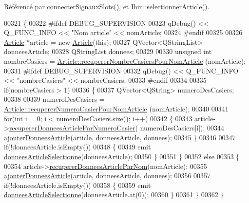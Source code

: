 Référencé par \hyperlink{_supervision_8cpp_source_l00273}{connecter\+Signaux\+Slots()}, et \hyperlink{_ihm_8cpp_source_l00291}{Ihm\+::selectionner\+Article()}.


\begin{DoxyCode}
00321 \{
00322 \textcolor{preprocessor}{    #ifdef DEBUG\_SUPERVISION}
00323         qDebug() << Q\_FUNC\_INFO << \textcolor{stringliteral}{"Nom article"} << nomArticle;
00324 \textcolor{preprocessor}{    #endif}
00325 
00326     \hyperlink{class_article}{Article} *article = \textcolor{keyword}{new} \hyperlink{class_article}{Article}(\textcolor{keyword}{this});
00327     QVector<QStringList> donneesArticle;
00328     QStringList donnees;
00329 
00330     \textcolor{keywordtype}{unsigned} \textcolor{keywordtype}{int} nombreCasiers = \hyperlink{class_article_acdd796ad55a7fde0c229c8c2df7050cc}{Article::recupererNombreCasiersPourNomArticle}
      (nomArticle);    
00331 \textcolor{preprocessor}{    #ifdef DEBUG\_SUPERVISION}
00332         qDebug() << Q\_FUNC\_INFO << \textcolor{stringliteral}{"nombreCasiers"} << nombreCasiers;
00333 \textcolor{preprocessor}{    #endif}
00334 
00335     \textcolor{keywordflow}{if}(nombreCasiers > 1)
00336     \{
00337         QVector<QString> numeroDesCasiers;
00338 
00339         numeroDesCasiers = \hyperlink{class_article_aa311f3d149340622383c418444aa65a4}{Article::recupererNumeroCasierPourNomArticle}
      (nomArticle);
00340 
00341         \textcolor{keywordflow}{for}(\textcolor{keywordtype}{int} i = 0; i < numeroDesCasiers.size(); i++)
00342         \{
00343             article->\hyperlink{class_article_a5d8241c703f142bbc8b011f867fd953f}{recupererDonneesArticleParNumeroCasier}(
      numeroDesCasiers[i]);
00344             \hyperlink{class_supervision_ae6fc43cb8bdfd8045367c08d8e440359}{ajouterDonneesArticle}(article, donneesArticle, donnees);
00345         \}
00346 
00347         \textcolor{keywordflow}{if}(!donneesArticle.isEmpty())
00348         \{
00349             emit \hyperlink{class_supervision_ae486eafc331964e223c35ae2b54fa669}{donneesArticleSelectionne}(donneesArticle);
00350         \}
00351     \}
00352     \textcolor{keywordflow}{else}
00353     \{
00354         article->\hyperlink{class_article_a6eab145b46f5e1786c5ddf669ffabb6e}{recupererDonneesArticleParNom}(nomArticle);
00355         \hyperlink{class_supervision_ae6fc43cb8bdfd8045367c08d8e440359}{ajouterDonneesArticle}(article, donneesArticle, donnees);
00356 
00357         \textcolor{keywordflow}{if}(!donneesArticle.isEmpty())
00358         \{
00359             emit \hyperlink{class_supervision_ae486eafc331964e223c35ae2b54fa669}{donneesArticleSelectionne}(donneesArticle.at(0));
00360         \}
00361     \}
00362 \}
\end{DoxyCode}
\mbox{\label{class_supervision_ae72bdcb7d70bbb8e13cf61be95ee7c06}} 
